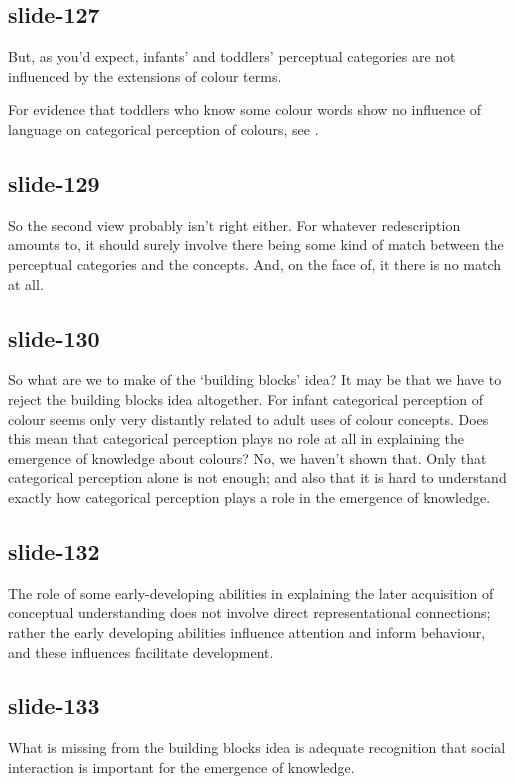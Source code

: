 \documentclass[12pt,\papersize]{extarticle}
\begin{document}
\subsection{slide-127}
But, as you'd expect, infants’ and toddlers’ perceptual categories are not influenced by the extensions of colour terms.

For evidence that toddlers who know some colour words show no influence of language on categorical perception of colours, see \citet{Franklin:2005hp}.

\subsection{slide-129}
So the second view probably isn't right either.
For whatever redescription amounts to, it should surely involve there being some kind of match between the perceptual categories and the concepts.
And, on the face of, it there is no match at all.

\subsection{slide-130}
So what are we to make of the ‘building blocks’ idea?
It may be that we have to reject the building blocks idea altogether.
For infant categorical perception of colour seems only very distantly related to adult uses of colour concepts.
Does this mean that categorical perception plays no role at all in explaining the emergence of knowledge about colours?
No, we haven't shown that.  Only that categorical perception alone is not enough; and also that
it is hard to understand exactly how categorical perception plays a role in the emergence of knowledge.

\subsection{slide-132}
The role of some early-developing abilities in explaining the later acquisition of conceptual
understanding does not involve direct representational connections; rather the early developing
abilities influence attention and inform behaviour, and these influences facilitate
development.

\subsection{slide-133}
What is missing from the building blocks idea is adequate recognition that social interaction is
important for the emergence of knowledge.
\end{document}
